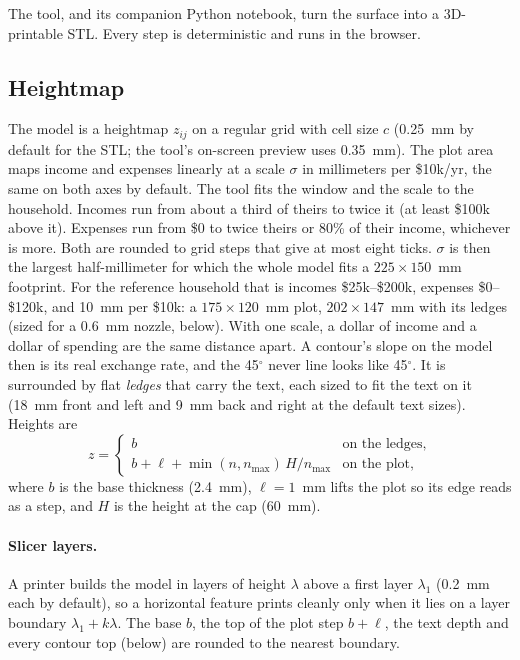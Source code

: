 \documentclass[11pt,letterpaper]{article}
\begin{document}
The tool, and its companion Python notebook, turn the surface into a 3D-printable STL. Every step is deterministic and runs in the browser.

\subsection{Heightmap}

The model is a heightmap $z_{ij}$ on a regular grid with cell size $c$ (0.25~mm by default for the STL; the tool's on-screen preview uses 0.35~mm). The plot area maps income and expenses linearly at a scale $\sigma$ in millimeters per \$10k/yr, the same on both axes by default. The tool fits the window and the scale to the household. Incomes run from about a third of theirs to twice it (at least \$100k above it). Expenses run from \$0 to twice theirs or 80\% of their income, whichever is more. Both are rounded to grid steps that give at most eight ticks. $\sigma$ is then the largest half-millimeter for which the whole model fits a $225 \times 150$~mm footprint. For the reference household that is incomes \$25k--\$200k, expenses \$0--\$120k, and 10~mm per \$10k: a $175 \times 120$~mm plot, $202 \times 147$~mm with its ledges (sized for a 0.6~mm nozzle, below). With one scale, a dollar of income and a dollar of spending are the same distance apart. A contour's slope on the model then is its real exchange rate, and the 45$^\circ$ never line looks like 45$^\circ$. It is surrounded by flat \emph{ledges} that carry the text, each sized to fit the text on it (18~mm front and left and 9~mm back and right at the default text sizes). Heights are
\begin{equation}
z = \begin{cases}
b & \text{on the ledges}, \\
b + \ell + \min(n, n_{\max})\,H/n_{\max} & \text{on the plot},
\end{cases}
\end{equation}
where $b$ is the base thickness (2.4~mm), $\ell = 1$~mm lifts the plot so its edge reads as a step, and $H$ is the height at the cap (60~mm).

\paragraph{Slicer layers.} A printer builds the model in layers of height $\lambda$ above a first layer $\lambda_1$ (0.2~mm each by default), so a horizontal feature prints cleanly only when it lies on a layer boundary $\lambda_1 + k\lambda$. The base $b$, the top of the plot step $b + \ell$, the text depth and every contour top (below) are rounded to the nearest boundary.
\end{document}
